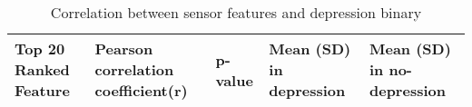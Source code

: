  
\begin{table}[h]
\caption{\label{tab:correlation} Correlation between sensor features and depression binary}


  
\footnotesize
\centering  
    \begin{tabular}{p{3cm}|p{2cm}|p{1cm}|p{3cm}|p{3cm}}
    \toprule
    Top 20 Ranked Feature & Pearson correlation coefficient(r) & p-value & Mean (SD) in depression & Mean (SD) in no-depression \\ 
    \midrule


\end{tabular}
\end{table}
